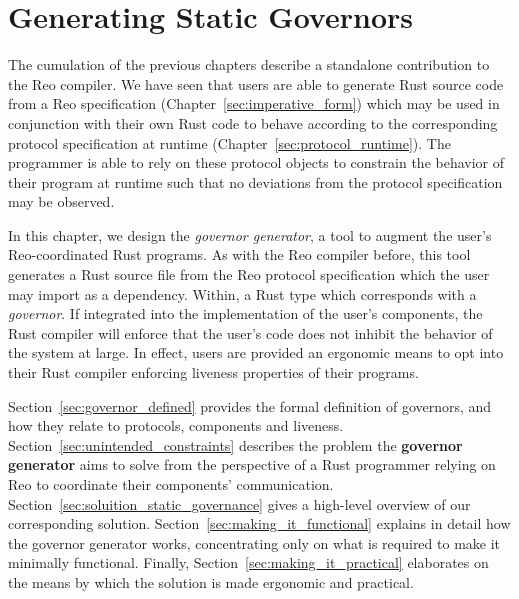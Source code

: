 \chapter{Generating Static Governors}
\label{sec:api}

The cumulation of the previous chapters describe a standalone contribution to the Reo compiler. We have seen that users are able to generate Rust source code from a Reo specification (Chapter~\ref{sec:imperative_form}) which may be used in conjunction with their own Rust code to behave according to the corresponding protocol specification at runtime (Chapter~\ref{sec:protocol_runtime}). The programmer is able to rely on these protocol objects to constrain the behavior of their program at runtime such that no deviations from the protocol specification may be observed. 

In this chapter, we design the \textit{governor generator}, a tool to augment the user's Reo-coordinated Rust programs. As with the Reo compiler before, this tool generates a Rust source file from the Reo protocol specification which the user may import as a dependency. Within, a Rust type which corresponds with a \textit{governor}. If integrated into the implementation of the user's components, the Rust compiler will enforce that the user's code does not inhibit the behavior of the system at large. In effect, users are provided an ergonomic means to opt into their Rust compiler enforcing liveness properties of their programs. 

Section~\ref{sec:governor_defined} provides the formal definition of governors, and how they relate to protocols, components and liveness. Section~\ref{sec:unintended_constraints} describes the problem the \textbf{governor generator} aims to solve from the perspective of a Rust programmer relying on Reo to coordinate their components' communication. Section~\ref{sec:soluition_static_governance} gives a high-level overview of our corresponding solution. Section~\ref{sec:making_it_functional} explains in detail how the governor generator works, concentrating only on what is required to make it minimally functional. Finally, Section~\ref{sec:making_it_practical} elaborates on the means by which the solution is made ergonomic and practical.

